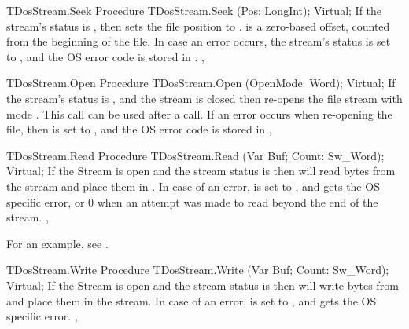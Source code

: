 

\begin{procedure}{TDosStream.Seek}
\Declaration
Procedure TDosStream.Seek (Pos: LongInt); Virtual;
\Description
If the stream's status is , then  sets the 
file position to .  is a zero-based offset, counted from
the beginning of the file.
\Errors
In case an error occurs, the stream's status is set to ,
and the OS error code is stored in .
\SeeAlso
{}, 
\end{procedure}



\begin{procedure}{TDosStream.Open}
\Declaration
Procedure TDosStream.Open (OpenMode: Word); Virtual;
\Description
If the stream's status is , and the stream is closed then
 re-opens the file stream with mode .
This call can be used after a  call.
\Errors
If an error occurs when re-opening the file, then  is set
to , and the OS error code is stored in 
\SeeAlso
{}, 
\end{procedure}



\begin{procedure}{TDosStream.Read}
\Declaration
Procedure TDosStream.Read (Var Buf; Count: Sw\_Word); Virtual;
\Description
If the Stream is open and the stream status is  then 
 will read  bytes from the stream and place them
in  .
\Errors
In case of an error,  is set to , and
 gets the OS specific error, or 0 when an attempt was
made to read beyond the end of the stream.
\SeeAlso
{}, 
\end{procedure}

For an example, see .

\begin{procedure}{TDosStream.Write}
\Declaration
Procedure TDosStream.Write (Var Buf; Count: Sw\_Word); Virtual;
\Description
If the Stream is open and the stream status is  then 
 will write  bytes from  and place them
in the stream.
\Errors
In case of an error,  is set to , and
 gets the OS specific error.
\SeeAlso
{}, 
\end{procedure}

